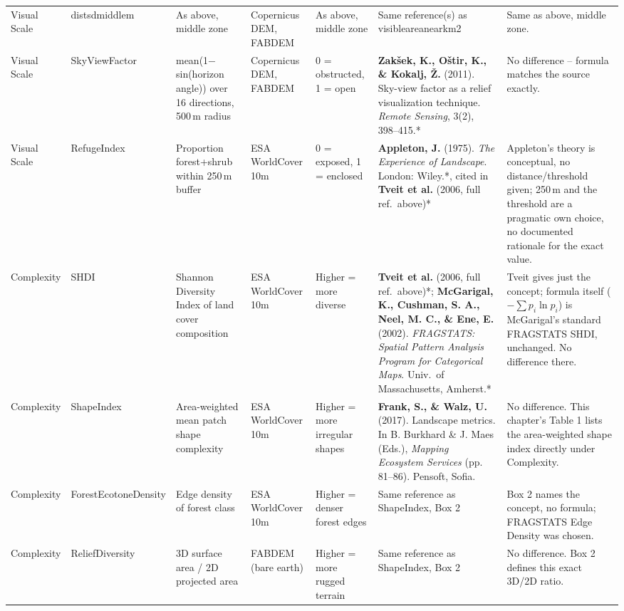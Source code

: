 \documentclass[11pt]{article}
\renewcommand{\_}{\textunderscore\allowbreak{}}
\begin{document}
\begin{landscape}
\begin{longtable}{@{}p{1.0cm} p{1.7cm} p{1.9cm} p{1.0cm} p{1.6cm} p{4.2cm} p{2.6cm}@{}}
Visual Scale & dist\_sd\_middle\_m & As above, middle zone & Copernicus DEM, FABDEM & As above, middle zone & Same reference(s) as visible\_area\_near\_km2 & Same as above, middle zone. \\
Visual Scale & SkyViewFactor & mean(1$-$sin(horizon angle)) over 16 directions, 500\,m radius & Copernicus DEM, FABDEM & 0 = obstructed, 1 = open & \textbf{Zak\v{s}ek, K., O\v{s}tir, K., \& Kokalj, \v{Z}.} (2011). Sky-view factor as a relief visualization technique. \textit{Remote Sensing}, 3(2), 398--415.* & No difference -- formula matches the source exactly. \\
Visual Scale & RefugeIndex & Proportion forest+shrub within 250\,m buffer & ESA WorldCover 10m & 0 = exposed, 1 = enclosed & \textbf{Appleton, J.} (1975). \textit{The Experience of Landscape}. London: Wiley.*, cited in \textbf{Tveit et al.} (2006, full ref.\ above)* & Appleton's theory is conceptual, no distance/threshold given; 250\,m and the threshold are a pragmatic own choice, no documented rationale for the exact value. \\
\midrule
Complexity & SHDI & Shannon Diversity Index of land cover composition & ESA WorldCover 10m & Higher = more diverse & \textbf{Tveit et al.} (2006, full ref.\ above)*; \textbf{McGarigal, K., Cushman, S. A., Neel, M. C., \& Ene, E.} (2002). \textit{FRAGSTATS: Spatial Pattern Analysis Program for Categorical Maps}. Univ.\ of Massachusetts, Amherst.* & Tveit gives just the concept; formula itself ($-\sum p_i\ln p_i$) is McGarigal's standard FRAGSTATS SHDI, unchanged. No difference there. \\
Complexity & ShapeIndex & Area-weighted mean patch shape complexity & ESA WorldCover 10m & Higher = more irregular shapes & \textbf{Frank, S., \& Walz, U.} (2017). Landscape metrics. In B. Burkhard \& J. Maes (Eds.), \textit{Mapping Ecosystem Services} (pp. 81--86). Pensoft, Sofia. & No difference. This chapter's Table 1 lists the area-weighted shape index directly under Complexity. \\
Complexity & ForestEcotoneDensity & Edge density of forest class & ESA WorldCover 10m & Higher = denser forest edges & Same reference as ShapeIndex, Box 2 & Box 2 names the concept, no formula; FRAGSTATS Edge Density was chosen. \\
Complexity & ReliefDiversity & 3D surface area / 2D projected area & FABDEM (bare earth) & Higher = more rugged terrain & Same reference as ShapeIndex, Box 2 & No difference. Box 2 defines this exact 3D/2D ratio. \\

\end{longtable}
\end{landscape}
\end{document}
